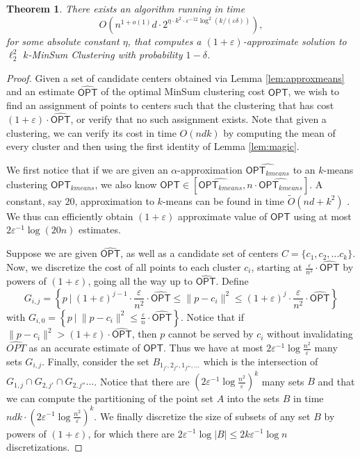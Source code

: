 \documentclass[11pt]{article}
\newtheorem{theorem}{Theorem}[section]
\def \OPT    {\mdef{\mathsf{OPT}}}
\newcommand{\mdef}[1]{{\ensuremath{#1}}\xspace}  %
\begin{document}
\begin{theorem}
    There exists an algorithm running in time
    $$O\left(n^{1+o(1)}d\cdot  2^{\eta\cdot k^2 \cdot \varepsilon^{-12} \log^2(k/(\varepsilon\delta))}\right),$$ 
    for some absolute constant $\eta$, that computes a $(1+\varepsilon)$-approximate solution to $\ell_2^2$ $k$-MinSum Clustering with probability $1-\delta$.
\end{theorem}
\begin{proof}
Given a set of candidate centers obtained via Lemma \ref{lem:approxmeans} and an estimate $\widehat{\OPT}$ of the optimal MinSum clustering cost $\OPT$, we wish to find an assignment of points to centers such that the clustering that has cost $(1+\varepsilon)\cdot\widehat{\OPT}$, or verify that no such assignment exists.
Note that given a clustering, we can verify its cost in time $O(ndk)$ by computing the mean of every cluster and then using the first identity of Lemma \ref{lem:magic}.

We first notice that if we are given an $\alpha$-approximation $\widehat{\OPT_{kmeans}}$ to an $k$-means clustering $\OPT_{kmeans}$, we also know $\OPT\in \left[\widehat{\OPT_{kmeans}},n\cdot \widehat{\OPT_{kmeans}}\right]$. A constant, say $20$, approximation to $k$-means can be found in time $\tilde{O}(nd + k^2)$ \cite{DraganovSS24}. We thus can efficiently obtain  $(1+\varepsilon)$ approximate value of $\OPT$ using at most $2\varepsilon^{-1}\log(20n)$ estimates.

Suppose we are given $\widehat{\OPT}$, as well as a candidate set of centers $C=\{c_1,c_2,\ldots c_k\}$.
Now, we discretize the cost of all points to each cluster $c_i$, starting at $\frac{\varepsilon}{n^2}\cdot \widehat{\OPT}$ by powers of $(1+\varepsilon)$, going all the way up to $\widehat{\OPT}$. Define 
$$G_{i,j}=\left\{p~|~ (1+\varepsilon)^{j-1} \cdot \frac{\varepsilon}{n^2}\cdot \widehat{\OPT}\leq \|p-c_i\|^2 \leq (1+\varepsilon)^{j} \cdot \frac{\varepsilon}{n^2}\cdot\widehat{\OPT}\right\}$$ 
with $G_{i,0} = \left\{p~|~ \|p-c_i\|^2 \leq \frac{\varepsilon}{ n}\cdot\widehat{\OPT}\right\}$. Notice that if $\|p-c_i\|^2>(1+\varepsilon)\cdot \widehat{\OPT}$, then $p$ cannot be served by $c_i$ without invalidating $\widehat{OPT}$ as an accurate estimate of $\OPT$. Thus we have at most $2\varepsilon^{-1}\log \frac{n^2}{\varepsilon}$ many sets $G_{i,j}$. Finally, consider the set 
$B_{1_{j'},2_{j''},1_{j'''},\ldots }$ which is the intersection of $G_{1,j}\cap G_{2,j'}\cap G_{2,j''}\ldots$.
Notice that there are $\left(2\varepsilon^{-1}\log \frac{n^2}{\varepsilon}\right)^k$ many sets $B$ and that we can compute the partitioning of the point set $A$ into the sets $B$ in time $ndk\cdot \left(2\varepsilon^{-1}\log \frac{n^2}{\varepsilon}\right)^k$.
We finally discretize the size of subsets of any set $B$ by powers of $(1+\varepsilon)$, for which there are $2\varepsilon^{-1}\log |B| \leq 2k\varepsilon^{-1}\log n$ discretizations. 


\end{proof}
\end{document}
